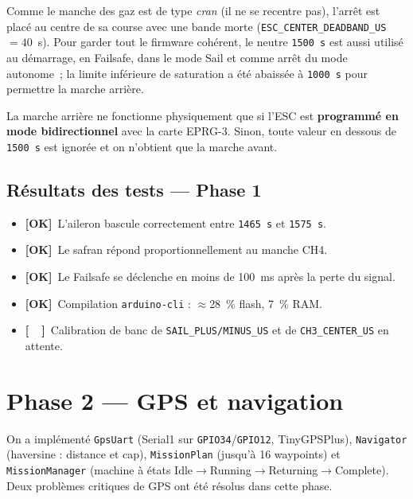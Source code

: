 \documentclass[12pt,a4paper]{article}
\newcommand{\gpio}[1]{\texttt{GPIO#1}}
\newcommand{\us}[1]{\texttt{#1\,\textmu s}}
\newcommand{\file}[1]{\texttt{#1}}
\newcommand{\done}{\textcolor{okborder}{\textbf{[OK]}}}
\newcommand{\todo}{\textcolor{warnborder}{\textbf{[\ \ ]}}}
\begin{document}
Comme le manche des gaz est de type \emph{cran} (il ne se recentre pas),
l'arr\^et est plac\'e au centre de sa course avec une bande morte
(\texttt{ESC\_CENTER\_DEADBAND\_US} $=40$~\textmu s). Pour garder tout le firmware
coh\'erent, le neutre \us{1500} est aussi utilis\'e au d\'emarrage, en Failsafe, dans
le mode Sail et comme arr\^et du mode autonome~; la limite inf\'erieure de saturation
a \'et\'e abaiss\'ee à \us{1000} pour permettre la marche arri\`ere.

\begin{warningbox}
  La marche arri\`ere ne fonctionne physiquement que si l'ESC est \textbf{programm\'e
  en mode bidirectionnel} avec la carte EPRG-3. Sinon, toute valeur en dessous de
  \us{1500} est ignor\'ee et on n'obtient que la marche avant.
\end{warningbox}

\subsection{R\'esultats des tests --- Phase 1}

\begin{itemize}
  \item \done\ L'aileron bascule correctement entre \us{1465} et \us{1575}.
  \item \done\ Le safran r\'epond proportionnellement au manche CH4.
  \item \done\ Le Failsafe se d\'eclenche en moins de 100~ms apr\`es la perte du signal.
  \item \done\ Compilation \texttt{arduino-cli} : $\approx$28~\% flash, 7~\% RAM.
  \item \todo\ Calibration de banc de \texttt{SAIL\_PLUS/MINUS\_US} et de
    \texttt{CH3\_CENTER\_US} en attente.
\end{itemize}

\section{Phase 2 --- GPS et navigation}

On a impl\'ement\'e \file{GpsUart} (Serial1 sur \gpio{34}/\gpio{12}, TinyGPSPlus),
\file{Navigator} (haversine : distance et cap), \file{MissionPlan} (jusqu'à 16
waypoints) et \file{MissionManager} (machine à \'etats
Idle$\to$Running$\to$Returning$\to$Complete). Deux probl\`emes critiques de GPS ont
\'et\'e r\'esolus dans cette phase.
\end{document}
